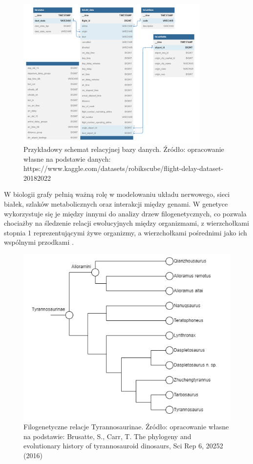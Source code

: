 \begin{figure}[ht]
	\centering
	\includegraphics[height=7.5cm]{resources/introduction/images/database.png}
	\caption{Przykładowy schemat relacyjnej bazy danych.
		Źródło: opracowanie własne na podstawie danych:
		https://www.kaggle.com/datasets/robikscube/flight-delay-dataset-20182022}
    \label{Fig:intro-2}
\end{figure}

W biologii grafy pełnią ważną rolę w modelowaniu układu nerwowego, sieci białek,
szlaków metabolicznych oraz interakcji między genami.
W genetyce wykorzystuje się je między innymi do analizy drzew filogenetycznych,
co pozwala chociażby na śledzenie relacji ewolucyjnych między organizmami,
z wierzchołkami stopnia 1 reprezentującymi żywe organizmy,
a wierzchołkami pośrednimi jako ich wspólnymi przodkami \cite{Erciyes2023}.

\begin{figure}[ht]
	\centering
	\includegraphics[width=12cm]{resources/introduction/images/dino.png}
	\caption{Filogenetyczne relacje Tyrannosaurinae.
		Źródło: opracowanie własne na podstawie:
		Brusatte, S., Carr, T. The phylogeny and evolutionary history of tyrannosauroid dinosaurs, Sci Rep 6, 20252 (2016)}
    \label{Fig:intro-3}
\end{figure}

